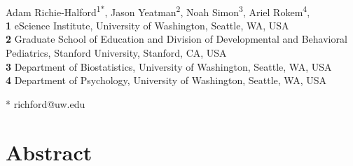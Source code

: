 \documentclass[10pt,letterpaper]{article}
\begin{document}
\vspace*{0.2in}

\begin{flushleft}
{\Large
\textbf{} %
}
\newline
\\
Adam Richie-Halford\textsuperscript{1*},
Jason Yeatman\textsuperscript{2},
Noah Simon\textsuperscript{3},
Ariel Rokem\textsuperscript{4},
\\
\bigskip
\textbf{1} eScience Institute, University of Washington, Seattle, WA, USA
\\
\textbf{2} Graduate School of Education and Division of Developmental and Behavioral Pediatrics, Stanford University, Stanford, CA, USA
\\
\textbf{3} Department of Biostatistics, University of Washington, Seattle, WA, USA
\\
\textbf{4} Department of Psychology, University of Washington, Seattle, WA, USA
\\
\bigskip

* richford@uw.edu

\end{flushleft}

\newcommand*{\alsLRatio}{$0.21$}
\newcommand*{\whLRatio}{$0.84$}
\newcommand*{\hbnLRatio}{$0.72$}
\newcommand*{\ccLRatio}{$0.83$}
\newcommand*{\alsAccuracy}{$83$}
\newcommand*{\alsRocAuc}{$0.88$}
\newcommand*{\whRsq}{$0.52$}
\newcommand*{\whMae}{$2.84$}
\newcommand*{\hbnRsq}{$0.56$}
\newcommand*{\hbnMae}{$1.5$}
\newcommand*{\camcanRsq}{$0.77$}
\newcommand*{\camcanMae}{$6.02$}

\section*{Abstract}
\end{document}
